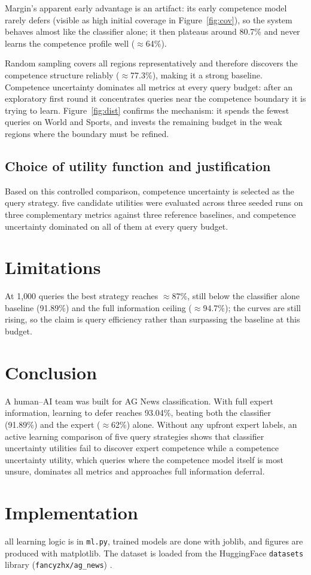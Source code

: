 \documentclass[11pt]{article}
\begin{document}
Margin's apparent early advantage is an artifact: its early competence model rarely defers (visible as high initial coverage in Figure~\ref{fig:cov}), so the system behaves almost like the classifier alone; it then plateaus around 80.7\% and never learns the competence profile well ($\approx$64\%).

Random sampling covers all regions representatively and therefore discovers the competence structure reliably ($\approx$77.3\%), making it a strong baseline. Competence uncertainty dominates all metrics at every query budget: after an exploratory first round it concentrates queries near the competence boundary it is trying to learn. Figure~\ref{fig:dist} confirms the mechanism: it spends the fewest queries on World and Sports, and invests the remaining budget in the weak regions where the boundary must be refined.

\subsection{Choice of utility function and justification}
Based on this controlled comparison, competence uncertainty is selected as the query strategy. five candidate utilities were evaluated across three seeded runs on three complementary metrics against three reference baselines, and competence uncertainty dominated on all of them at every query budget.

\section{Limitations}
At 1{,}000 queries the best strategy reaches $\approx$87\%, still below the classifier alone baseline (91.89\%) and the full information ceiling ($\approx$94.7\%); the curves are still rising, so the claim is query efficiency rather than surpassing the baseline at this budget. 

\section{Conclusion}
A human--AI team was built for AG News classification. With full expert information, learning to defer reaches 93.04\%, beating both the classifier (91.89\%) and the expert ($\approx$62\%) alone. Without any upfront expert labels, an active learning comparison of five query strategies shows that classifier uncertainty utilities fail to discover expert competence  while a competence uncertainty utility, which queries where the competence model itself is most unsure, dominates all metrics and approaches full information deferral.

\section*{Implementation}
 all learning logic is in \texttt{ml.py}, trained models are done with joblib, and figures are produced with matplotlib. The dataset is loaded from the HuggingFace \texttt{datasets} library (\texttt{fancyzhx/ag\_news}) .
\end{document}
